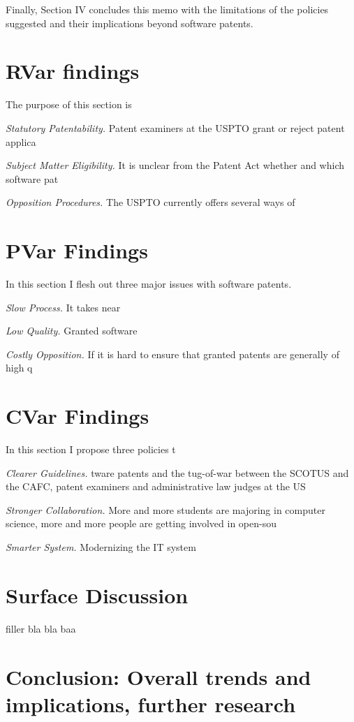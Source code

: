 \documentclass[12pt]{texmemo} %
\begin{document}
Finally, Section IV concludes this memo with the limitations of the policies suggested and their implications beyond software patents.

\section{RVar findings}

The purpose of this section is 

\textit{Statutory Patentability.} Patent examiners at the USPTO grant or reject patent applica

\textit{Subject Matter Eligibility.} It is unclear from the Patent Act whether and which software pat


\textit{Opposition Procedures.} The USPTO currently offers several ways of 
\section{PVar Findings}

In this section I flesh out three major issues with software patents.

\textit{Slow Process.} It takes near

\textit{Low Quality.} Granted software

\textit{Costly Opposition.} If it is hard to ensure that granted patents are generally of high q

\section{CVar Findings}

In this section I propose three policies t

\textit{Clearer Guidelines.} tware patents and the tug-of-war between the SCOTUS and the CAFC, patent examiners and administrative law judges at the US

\textit{Stronger Collaboration.} \cite{lee} More and more students are majoring in computer science, more and more people are getting involved in open-sou 

\textit{Smarter System.} Modernizing the IT system 

\section{Surface Discussion}
filler bla bla baa

\section{Conclusion: Overall trends and implications, further research}
\end{document}
